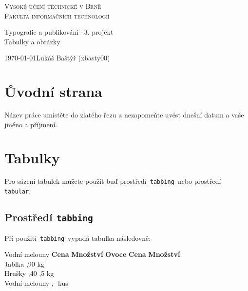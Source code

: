 \documentclass[11pt]{article}
\begin{document}
    \begin{titlepage}
        \begin{center}
            \Huge \textsc{Vysoké učení technické v Brně}\\
            \huge \textsc{Fakulta informačních technologií}

            \LARGE Typografie a publikování\,--\,3. projekt \\
            \Huge Tabulky a obrázky \\
        \end{center}
        \Large \today \hfill Lukáš Baštýř (xbasty00)
    \end{titlepage}

    \section{Ůvodní strana} \label{sec1}
    Název práce umístěte do zlatého řezu a nezapomeňte uvést dnešní datum a vaše jméno a příjmení.
    
    \section{Tabulky}   \label{sec2}
    Pro sázení tabulek můžete použít buď prostředí \,\texttt{tabbing} \,nebo prostředí \,\texttt{tabular}.
    
        \subsection{Prostředí \texttt{tabbing}}
        Při použití \,\texttt{tabbing} \,vypadá tabulka následovně:
        
            \begin{tabbing}
                Vodní melouny \quad \= \textbf{Cena} \quad \= \textbf{Množství} \kill
                \textbf{Ovoce}      \> \textbf{Cena}       \> \textbf{Množství} \\
                Jablka              ,90                kg \\
                Hrušky              ,40               ,5 kg \\
                Vodní melouny       ,-                 kus \\
            \end{tabbing}
        
\end{document}
